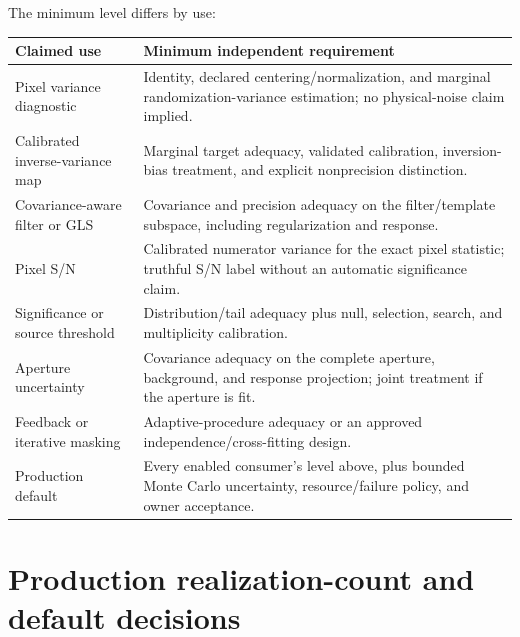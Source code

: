 \documentclass[11pt]{article}
\begin{document}
The minimum level differs by use:
\begin{longtable}{>{\raggedright\arraybackslash}p{}
                  >{\raggedright\arraybackslash}p{}}
\toprule
Claimed use & Minimum independent requirement \\
\midrule
\endhead
Pixel variance diagnostic & Identity, declared centering/normalization, and
marginal randomization-variance estimation; no physical-noise claim implied. \\
Calibrated inverse-variance map & Marginal target adequacy, validated
calibration, inversion-bias treatment, and explicit nonprecision distinction. \\
Covariance-aware filter or GLS & Covariance and precision adequacy on the
filter/template subspace, including regularization and response. \\
Pixel S/N & Calibrated numerator variance for the exact pixel statistic;
truthful S/N label without an automatic significance claim. \\
Significance or source threshold & Distribution/tail adequacy plus null,
selection, search, and multiplicity calibration. \\
Aperture uncertainty & Covariance adequacy on the complete aperture,
background, and response projection; joint treatment if the aperture is fit. \\
Feedback or iterative masking & Adaptive-procedure adequacy or an approved
independence/cross-fitting design. \\
Production default & Every enabled consumer's level above, plus bounded Monte
Carlo uncertainty, resource/failure policy, and owner acceptance. \\
\bottomrule
\end{longtable}

\section{Production realization-count and default decisions}
\end{document}
